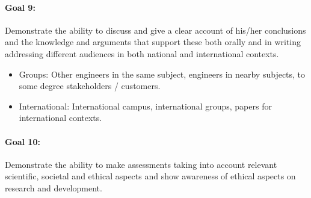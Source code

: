 %
%

\paragraph{Goal 9:} Demonstrate the ability to discuss and give a
clear account of his/her conclusions and the knowledge and arguments
that support these both orally and in writing addressing different
audiences in both national and international contexts.
\begin{itemize}
\item Groups: Other engineers in the same subject, engineers in nearby
  subjects, to some degree stakeholders / customers.
\item International: International campus, international groups,
  papers for international contexts.
\end{itemize}
%
%
%
%

\paragraph{Goal 10:} Demonstrate the ability to make assessments
taking into account relevant scientific, societal and ethical aspects
and show awareness of ethical aspects on research and development.


